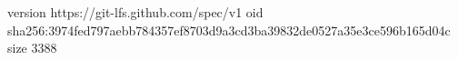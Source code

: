 version https://git-lfs.github.com/spec/v1
oid sha256:3974fed797aebb784357ef8703d9a3cd3ba39832de0527a35e3ce596b165d04c
size 3388
